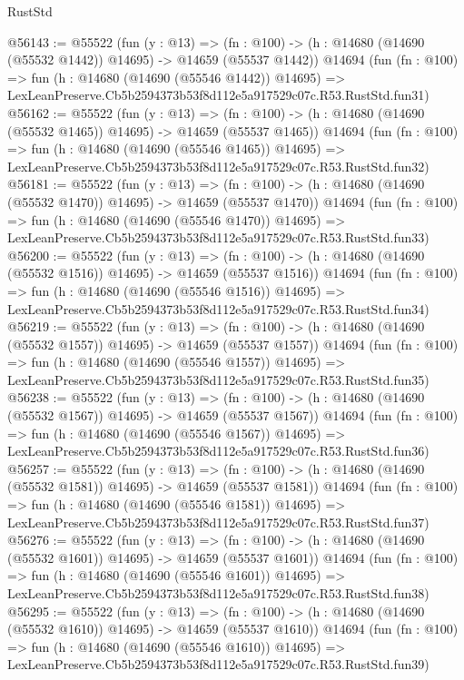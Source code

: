 \begin{lexlean}{RustStd}
\begin{coremodule}
@56143 := @55522
    (fun (y : @13) =>
    (fn : @100) -> (h : @14680 (@14690 (@55532 @1442)) @14695) -> @14659 (@55537 @1442))
    @14694
    (fun (fn : @100) =>
    fun (h : @14680 (@14690 (@55546 @1442)) @14695) =>
    LexLeanPreserve.Cb5b2594373b53f8d112e5a917529c07c.R53.RustStd.fun31)
@56162 := @55522
    (fun (y : @13) =>
    (fn : @100) -> (h : @14680 (@14690 (@55532 @1465)) @14695) -> @14659 (@55537 @1465))
    @14694
    (fun (fn : @100) =>
    fun (h : @14680 (@14690 (@55546 @1465)) @14695) =>
    LexLeanPreserve.Cb5b2594373b53f8d112e5a917529c07c.R53.RustStd.fun32)
@56181 := @55522
    (fun (y : @13) =>
    (fn : @100) -> (h : @14680 (@14690 (@55532 @1470)) @14695) -> @14659 (@55537 @1470))
    @14694
    (fun (fn : @100) =>
    fun (h : @14680 (@14690 (@55546 @1470)) @14695) =>
    LexLeanPreserve.Cb5b2594373b53f8d112e5a917529c07c.R53.RustStd.fun33)
@56200 := @55522
    (fun (y : @13) =>
    (fn : @100) -> (h : @14680 (@14690 (@55532 @1516)) @14695) -> @14659 (@55537 @1516))
    @14694
    (fun (fn : @100) =>
    fun (h : @14680 (@14690 (@55546 @1516)) @14695) =>
    LexLeanPreserve.Cb5b2594373b53f8d112e5a917529c07c.R53.RustStd.fun34)
@56219 := @55522
    (fun (y : @13) =>
    (fn : @100) -> (h : @14680 (@14690 (@55532 @1557)) @14695) -> @14659 (@55537 @1557))
    @14694
    (fun (fn : @100) =>
    fun (h : @14680 (@14690 (@55546 @1557)) @14695) =>
    LexLeanPreserve.Cb5b2594373b53f8d112e5a917529c07c.R53.RustStd.fun35)
@56238 := @55522
    (fun (y : @13) =>
    (fn : @100) -> (h : @14680 (@14690 (@55532 @1567)) @14695) -> @14659 (@55537 @1567))
    @14694
    (fun (fn : @100) =>
    fun (h : @14680 (@14690 (@55546 @1567)) @14695) =>
    LexLeanPreserve.Cb5b2594373b53f8d112e5a917529c07c.R53.RustStd.fun36)
@56257 := @55522
    (fun (y : @13) =>
    (fn : @100) -> (h : @14680 (@14690 (@55532 @1581)) @14695) -> @14659 (@55537 @1581))
    @14694
    (fun (fn : @100) =>
    fun (h : @14680 (@14690 (@55546 @1581)) @14695) =>
    LexLeanPreserve.Cb5b2594373b53f8d112e5a917529c07c.R53.RustStd.fun37)
@56276 := @55522
    (fun (y : @13) =>
    (fn : @100) -> (h : @14680 (@14690 (@55532 @1601)) @14695) -> @14659 (@55537 @1601))
    @14694
    (fun (fn : @100) =>
    fun (h : @14680 (@14690 (@55546 @1601)) @14695) =>
    LexLeanPreserve.Cb5b2594373b53f8d112e5a917529c07c.R53.RustStd.fun38)
@56295 := @55522
    (fun (y : @13) =>
    (fn : @100) -> (h : @14680 (@14690 (@55532 @1610)) @14695) -> @14659 (@55537 @1610))
    @14694
    (fun (fn : @100) =>
    fun (h : @14680 (@14690 (@55546 @1610)) @14695) =>
    LexLeanPreserve.Cb5b2594373b53f8d112e5a917529c07c.R53.RustStd.fun39)

\end{coremodule}
\end{lexlean}
